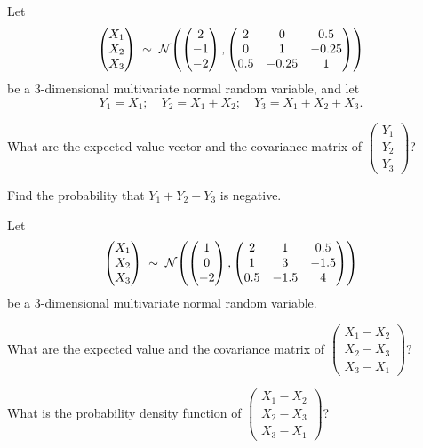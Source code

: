 \begin{exercises}
\item Let
\[
\begin{pmatrix} X_1 \\ X_2 \\ X_3 \end{pmatrix} \;\sim\; \mathcal{N}\!\left(
\begin{pmatrix} 2 \\ -1 \\ -2 \end{pmatrix},
\begin{pmatrix} 2 & 0 & 0.5 \\ 0 & 1 & -0.25 \\ 0.5 & -0.25 & 1 \end{pmatrix}\right)
\]
be a 3-dimensional multivariate normal random variable, and let
\[
Y_1 = X_1; \quad Y_2 = X_1 + X_2; \quad Y_3 = X_1 + X_2 + X_3.
\]

\begin{subparts}
\item What are the expected value vector and the covariance matrix of
$\begin{pmatrix} Y_1 \\ Y_2 \\ Y_3 \end{pmatrix}$?
\item Find the probability that $Y_1 + Y_2 + Y_3$ is negative.
\end{subparts}

\item Let
\[
\begin{pmatrix} X_1 \\ X_2 \\ X_3 \end{pmatrix} \;\sim\; \mathcal{N}\!\left(
\begin{pmatrix} 1 \\ 0 \\ -2 \end{pmatrix},
\begin{pmatrix} 2 & 1 & 0.5 \\ 1 & 3 & -1.5 \\ 0.5 & -1.5 & 4 \end{pmatrix}\right)
\]
be a 3-dimensional multivariate normal random variable.

\begin{subparts}
\item What are the expected value and the covariance matrix of
$\begin{pmatrix} X_1 - X_2 \\ X_2 - X_3 \\ X_3 - X_1 \end{pmatrix}$?
\item What is the probability density function of
$\begin{pmatrix} X_1 - X_2 \\ X_2 - X_3 \\ X_3 - X_1 \end{pmatrix}$?
\end{subparts}


\end{exercises}
